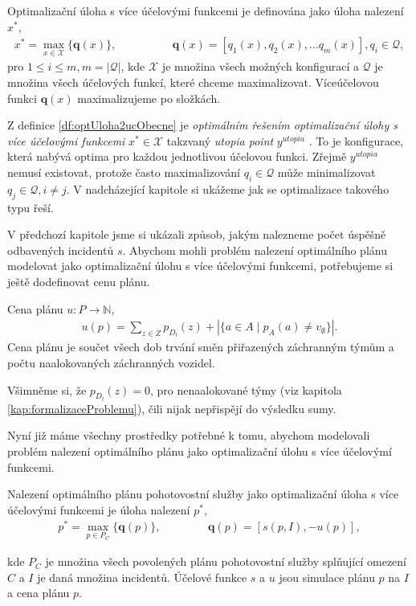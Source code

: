 \begin{definice}\label{df:optUloha2ucObecne}
  Optimalizační úloha s více účelovými funkcemi je definována jako úloha nalezení $x^*$,
  \begin{align*}
    x^* = \max_{x \in \mathcal{X}} \{ \mathbf{q}(x) \}, \hspace{50pt} &\mathbf{q}(x) = [q_1(x), q_2(x), \dots q_{m}(x)], q_i \in \mathcal{Q},
  \end{align*}
  pro $1 \leq i \leq m, m = |\mathcal{Q}|$,
  kde $\mathcal{X}$ je množina všech možných konfigurací a $\mathcal{Q}$ je množina všech účelových funkcí, které chceme maximalizovat.
  Víceúčelovou funkci $\mathbf{q}(x)$ maximalizujeme po složkách.
\end{definice}
Z definice \ref{df:optUloha2ucObecne} je \textit{optimálním řešením optimalizační úlohy s více účelovými funkcemi}
$x^* \in \mathcal{X}$ takzvaný \textit{utopia point} $y^{utopia}$ \cite{AlgOptBook}.
To je konfigurace, která nabývá optima pro každou jednotlivou účelovou funkci.
Zřejmě $y^{utopia}$ nemusí existovat, protože často maximalizování $q_i \in \mathcal{Q}$ může minimalizovat $q_j \in \mathcal{Q}, i \neq j$.
V nadcházející kapitole si ukážeme jak se optimalizace takového typu řeší.

V předchozí kapitole jsme si ukázali způsob, jakým nalezneme počet úspěšně odbavených incidentů $s$. 
Abychom mohli problém nalezení optimálního plánu modelovat jako optimalizační úlohu s více účelovými funkcemi, potřebujeme si ještě dodefinovat cenu plánu.
\begin{definice}\label{df:cenaPlanu}
  Cena plánu $u \colon P \rightarrow \mathbb{N}$,
  \begin{align*}
    u(p) = \sum_{z \in Z} p_{D_l}(z) + |\{ a \in A \mid p_{A}(a) \neq v_{\emptyset} \}|.
  \end{align*}
  Cena plánu je součet všech dob trvání směn přiřazených záchranným týmům a počtu naalokovaných záchranných vozidel.
\end{definice}

Všimněme si, že $p_{D_l}(z) = 0$, pro nenaalokované týmy (viz kapitola \ref{kap:formalizaceProblemu}), čili nijak nepřispějí do výsledku sumy.

Nyní již máme všechny prostředky potřebné k tomu, abychom modelovali problém nalezení optimálního plánu jako optimalizační úlohu s více účelovýmí funkcemi. 
\begin{definice}\label{df:optUloha2uc}
  Nalezení optimálního plánu pohotovostní služby jako optimalizační úloha s více účelovými funkcemi je úloha nalezení $p^*$,
  \begin{align*}
    p^* = \max_{p \in P_C} \{ \mathbf{q}(p) \}, \hspace{50pt} \mathbf{q}(p) = [s(p, I), -u(p)],
  \end{align*}

  kde $P_C$ je množina všech povolených plánu pohotovostní služby splňující omezení $C$ a $I$ je daná množina incidentů.
  Účelové funkce $s$ a $u$ jsou simulace plánu $p$ na $I$ a cena plánu $p$.
\end{definice}

